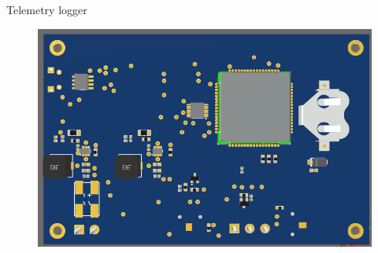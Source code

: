 \documentclass[aspectratio=169]{beamer}
\begin{document}
\begin{frame}{Telemetry logger}
\begin{figure}[H]
\begin{columns}[T]
\begin{column}{.3\linewidth}
        \includegraphics[width=\linewidth]{images/telebot3}
      \end{column}
    \end{columns}
  \end{figure}
\end{frame}
\end{document}
